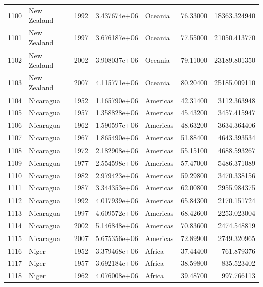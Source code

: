 \documentclass[
  letterpaper,
  DIV=11,
  numbers=noendperiod]{scrreprt}
\begin{document}
\begin{tabular}{llrrlrr}
1100 &               New Zealand &  1992 &  3.437674e+06 &   Oceania &  76.33000 &   18363.324940 \\
1101 &               New Zealand &  1997 &  3.676187e+06 &   Oceania &  77.55000 &   21050.413770 \\
1102 &               New Zealand &  2002 &  3.908037e+06 &   Oceania &  79.11000 &   23189.801350 \\
1103 &               New Zealand &  2007 &  4.115771e+06 &   Oceania &  80.20400 &   25185.009110 \\
1104 &                 Nicaragua &  1952 &  1.165790e+06 &  Americas &  42.31400 &    3112.363948 \\
1105 &                 Nicaragua &  1957 &  1.358828e+06 &  Americas &  45.43200 &    3457.415947 \\
1106 &                 Nicaragua &  1962 &  1.590597e+06 &  Americas &  48.63200 &    3634.364406 \\
1107 &                 Nicaragua &  1967 &  1.865490e+06 &  Americas &  51.88400 &    4643.393534 \\
1108 &                 Nicaragua &  1972 &  2.182908e+06 &  Americas &  55.15100 &    4688.593267 \\
1109 &                 Nicaragua &  1977 &  2.554598e+06 &  Americas &  57.47000 &    5486.371089 \\
1110 &                 Nicaragua &  1982 &  2.979423e+06 &  Americas &  59.29800 &    3470.338156 \\
1111 &                 Nicaragua &  1987 &  3.344353e+06 &  Americas &  62.00800 &    2955.984375 \\
1112 &                 Nicaragua &  1992 &  4.017939e+06 &  Americas &  65.84300 &    2170.151724 \\
1113 &                 Nicaragua &  1997 &  4.609572e+06 &  Americas &  68.42600 &    2253.023004 \\
1114 &                 Nicaragua &  2002 &  5.146848e+06 &  Americas &  70.83600 &    2474.548819 \\
1115 &                 Nicaragua &  2007 &  5.675356e+06 &  Americas &  72.89900 &    2749.320965 \\
1116 &                     Niger &  1952 &  3.379468e+06 &    Africa &  37.44400 &     761.879376 \\
1117 &                     Niger &  1957 &  3.692184e+06 &    Africa &  38.59800 &     835.523402 \\
1118 &                     Niger &  1962 &  4.076008e+06 &    Africa &  39.48700 &     997.766113 \\

\end{tabular}
\end{document}
